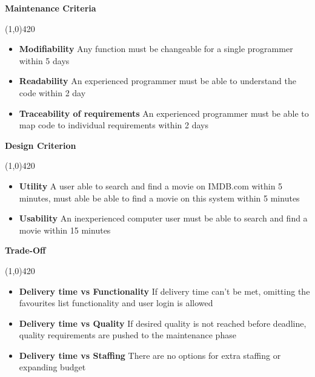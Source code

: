 \vspace{0.5cm}

\textbf{Maintenance Criteria}
\vspace{-1.1cm}
\begin{center}
\line(1,0){420}
\end{center}
\begin{itemize}
\item \textbf{Modifiability} Any function must be changeable for a single programmer within 5 days
\item \textbf{Readability} An experienced programmer must be able to understand the code within 2 day
\item \textbf{Traceability of requirements} An experienced programmer must be able to map code to individual requirements within 2 days
\end{itemize}

\vspace{0.5cm}

\textbf{Design Criterion}
\vspace{-1.1cm}
\begin{center}
\line(1,0){420}
\end{center}
\begin{itemize}
\item \textbf{Utility} A user able to search and find a movie on IMDB.com within 5 minutes, must able be able to find a movie on this system within 5 minutes
\item \textbf{Usability} An inexperienced computer user must be able to search and find a movie within 15 minutes
\end{itemize}

\vspace{0.5cm}

\textbf{Trade-Off}
\vspace{-1.1cm}
\begin{center}
\line(1,0){420}
\end{center}
\begin{itemize}
\item\textbf{Delivery time vs Functionality} If delivery time can't be met, omitting the favourites list functionality and user login is allowed
\item\textbf{Delivery time vs Quality} If desired quality is not reached before deadline, quality requirements are pushed to the maintenance phase
\item\textbf{Delivery time vs Staffing} There are no options for extra staffing or expanding budget
\end{itemize}





